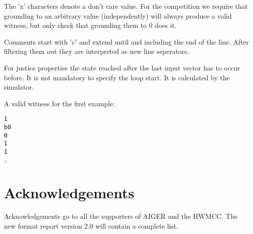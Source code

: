 \documentclass{llncs}
\begin{document}
The 'x' characters denote a don't care value.  For the competition
we require that grounding to an arbitrary value (independently) will
always produce a valid witness, but only check that grounding them
to 0 does it. 

Comments start with 'c' and extend until and including the end of the line.
After filtering them out they are interpreted as new line seperators.

For justice properties the state reached after the last input vector
has to occur before.  It is not mandatory to specify the
loop start.  It is calculated by the simulator.

A valid witness for the first example:
{\small
\begin{verbatim}
1
b0
0
1
1
.
\end{verbatim}}

\section{Acknowledgements}

Acknowledgements go to all the supporters of AIGER and the HWMCC.
The new format report version 2.0 will contain a complete list.
\end{document}
